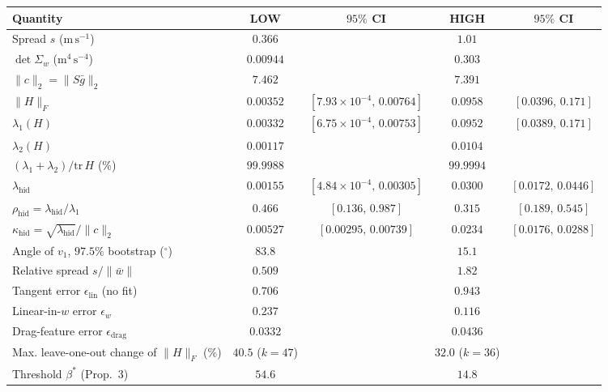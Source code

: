 \begin{tabular}{@{}lcccc@{}}
\toprule
Quantity & LOW & $95\%$ CI & HIGH & $95\%$ CI\\
\midrule
Spread $s$ ($\mathrm{m\,s^{-1}}$) & $0.366$ &  & $1.01$ & \\
$\det\Sigma_w$ ($\mathrm{m^4\,s^{-4}}$) & $0.00944$ &  & $0.303$ & \\
$\|c\|_2=\|S\bar g\|_2$ & $7.462$ &  & $7.391$ & \\
$\|H\|_F$ & $0.00352$ & $[7.93\times10^{-4},\,0.00764]$ & $0.0958$ & $[0.0396,\,0.171]$\\
$\lambda_1(H)$ & $0.00332$ & $[6.75\times10^{-4},\,0.00753]$ & $0.0952$ & $[0.0389,\,0.171]$\\
$\lambda_2(H)$ & $0.00117$ &  & $0.0104$ & \\
$(\lambda_1+\lambda_2)/\mathrm{tr}\,H$ (\%) & $99.9988$ &  & $99.9994$ & \\
$\lambda_{\mathrm{hid}}$ & $0.00155$ & $[4.84\times10^{-4},\,0.00305]$ & $0.0300$ & $[0.0172,\,0.0446]$\\
$\rho_{\mathrm{hid}}=\lambda_{\mathrm{hid}}/\lambda_1$ & $0.466$ & $[0.136,\,0.987]$ & $0.315$ & $[0.189,\,0.545]$\\
$\kappa_{\mathrm{hid}}=\sqrt{\lambda_{\mathrm{hid}}}/\|c\|_2$ & $0.00527$ & $[0.00295,\,0.00739]$ & $0.0234$ & $[0.0176,\,0.0288]$\\
Angle of $v_1$, $97.5\%$ bootstrap ($^\circ$) & $83.8$ &  & $15.1$ & \\
Relative spread $s/\|\bar w\|$ & $0.509$ &  & $1.82$ & \\
Tangent error $\epsilon_{\mathrm{lin}}$ (no fit) & $0.706$ &  & $0.943$ & \\
Linear-in-$w$ error $\epsilon_{w}$ & $0.237$ &  & $0.116$ & \\
Drag-feature error $\epsilon_{\mathrm{drag}}$ & $0.0332$ &  & $0.0436$ & \\
Max. leave-one-out change of $\|H\|_F$ (\%) & $40.5$ ($k=47$) &  & $32.0$ ($k=36$) & \\
Threshold $\beta^*$ (Prop.~3) & $54.6$ &  & $14.8$ & \\
\bottomrule
\end{tabular}
